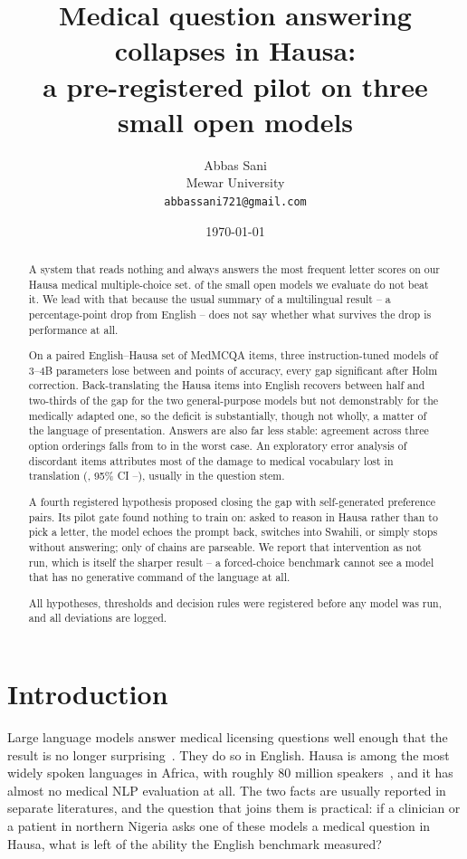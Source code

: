 \documentclass[11pt,a4paper]{article}
\title{Medical question answering collapses in Hausa:\\
a pre-registered pilot on three small open models}
\author{Abbas Sani\\
  Mewar University\\
  \texttt{abbassani721@gmail.com}}
\date{\today}
\begin{document}
\maketitle

\begin{abstract}
A system that reads nothing and always answers the most frequent letter scores
\BaselineP{} on our Hausa medical multiple-choice set. \NBelowBaseline{} of the
\NModels{} small open models we evaluate do not beat it. We lead with that
because the usual summary of a multilingual result -- a percentage-point drop
from English -- does not say whether what survives the drop is performance at
all.

On a paired English--Hausa set of \NEval{} MedMCQA items, three instruction-tuned
models of 3--4B parameters lose between \GapMedGemma{} and \GapQwen{} points of
accuracy, every gap significant after Holm correction. Back-translating the
Hausa items into English recovers between half and two-thirds of the gap for the
two general-purpose models but not demonstrably for the medically adapted one,
so the deficit is substantially, though not wholly, a matter of the language of
presentation. Answers are also far less stable: agreement across three option
orderings falls from \ConsEnQwen{} to \ConsHaQwen{} in the worst case. An
exploratory error analysis of \ENRows{} discordant items attributes most of the
damage to medical vocabulary lost in translation (\ETerm{}, 95\% CI
\ETermLo{}--\ETermHi{}), usually in the question stem.

A fourth registered hypothesis proposed closing the gap with self-generated
preference pairs. Its pilot gate found nothing to train on: asked to reason in
Hausa rather than to pick a letter, the model echoes the prompt back, switches
into Swahili, or simply stops without answering; only \GateParse{} of chains
are parseable. We
report that intervention as not run, which is itself the sharper result -- a
forced-choice benchmark cannot see a model that has no generative command of
the language at all.

All hypotheses, thresholds and decision rules were registered before any model
was run, and all deviations are logged.
\end{abstract}

\section{Introduction}

Large language models answer medical licensing questions well enough that the
result is no longer surprising~\cite{singhal2023clinical}. They do so in
English. Hausa is among the most widely spoken languages in Africa, 
with roughly 80 million speakers~\cite{ethnologue}, and it has almost no
medical NLP evaluation at all. The two facts are usually reported in separate
literatures, and the question that joins them is practical: if a clinician or a
patient in northern Nigeria asks one of these models a medical question in
Hausa, what is left of the ability the English benchmark measured?
\end{document}
